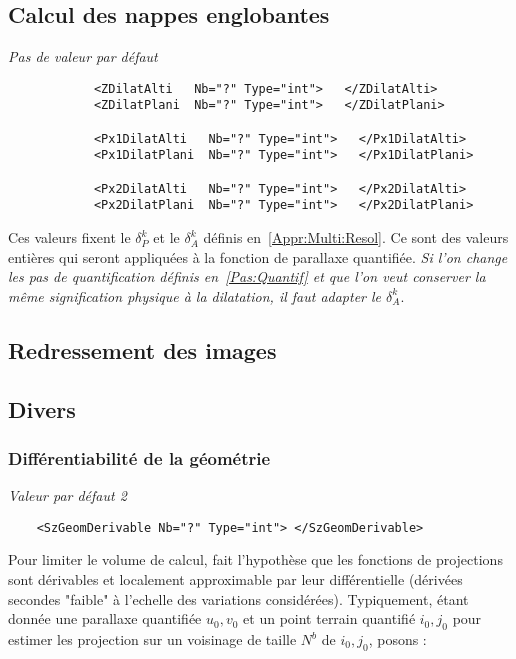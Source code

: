 \subsection{Calcul des nappes englobantes}

\emph{Pas de valeur par d\'efaut}
\begin{verbatim}
            <ZDilatAlti   Nb="?" Type="int">   </ZDilatAlti>
            <ZDilatPlani  Nb="?" Type="int">   </ZDilatPlani>

            <Px1DilatAlti   Nb="?" Type="int">   </Px1DilatAlti>
            <Px1DilatPlani  Nb="?" Type="int">   </Px1DilatPlani>

            <Px2DilatAlti   Nb="?" Type="int">   </Px2DilatAlti>
            <Px2DilatPlani  Nb="?" Type="int">   </Px2DilatPlani>
\end{verbatim}


Ces valeurs fixent le $\delta_{P}^k$ et le $\delta_{A}^k$ d\'efinis
en~\ref{Appr:Multi:Resol}. Ce sont des valeurs enti\`eres qui seront
appliqu\'ees \`a la fonction de parallaxe quantifi\'ee. \emph{Si
l'on change  les pas de quantification d\'efinis en~\ref{Pas:Quantif}
et que l'on veut conserver la m\^eme signification physique \`a la
dilatation, il faut adapter le  $\delta_{A}^k$}.



\subsection{Redressement des images}

\subsection{Divers}

\subsubsection{Diff\'erentiabilit\'e de la g\'eom\'etrie}

\emph{Valeur par d\'efaut 2}
\begin{verbatim}
    <SzGeomDerivable Nb="?" Type="int"> </SzGeomDerivable>
\end{verbatim}

Pour limiter le volume de calcul, fait l'hypoth\`ese que les
fonctions de projections sont d\'erivables et localement 
approximable par leur diff\'erentielle (d\'eriv\'ees secondes
"faible" \`a l'echelle des variations consid\'er\'ees). Typiquement, \'etant
donn\'ee une parallaxe quantifi\'ee $u_0,v_0$ et un point
terrain quantifi\'e $i_0,j_0$ pour estimer les  projection
sur un voisinage de taille $N^b$ de $i_0,j_0$, posons :

